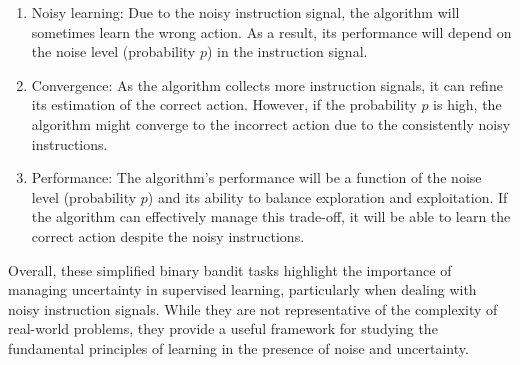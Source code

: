 \documentclass{article}
\begin{document}
\begin{enumerate}
\item Noisy learning: Due to the noisy instruction signal, the 
algorithm will sometimes learn the wrong action. As a result, its 
performance will depend on the noise level (probability $p$) in 
the instruction signal.

\item Convergence: As the algorithm collects more 
instruction signals, it can refine its estimation of the correct 
action. However, if the probability $p$ is high, the 
algorithm might converge to the incorrect action due to the 
consistently noisy instructions.

\item Performance: The algorithm's performance will be a function of 
the noise level (probability $p$) and its ability to balance 
exploration and exploitation. If the algorithm can effectively 
manage this trade-off, it will be able to learn the correct action 
despite the noisy instructions.
\end{enumerate}

Overall, these simplified binary bandit tasks highlight the 
importance of managing uncertainty in supervised learning, 
particularly when dealing with noisy instruction signals. While 
they are not representative of the complexity of real-world problems, 
they provide a useful framework for studying the fundamental 
principles of learning in the presence of noise and uncertainty.
\end{document}
